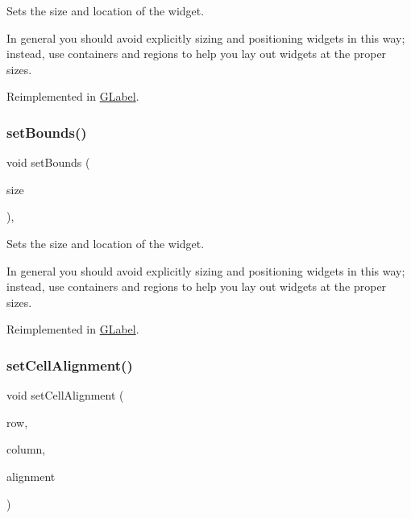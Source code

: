 Sets the size and location of the widget. 

In general you should avoid explicitly sizing and positioning widgets in this way; instead, use containers and regions to help you lay out widgets at the proper sizes. 

Reimplemented in \mbox{\hyperlink{classGLabel_aab3121dc97f8c5c1ddee39ea81d08509}{G\+Label}}.

\mbox{\label{classGInteractor_acada386653f008cacc7cce86426bef7c}} 
\subsubsection{\texorpdfstring{set\+Bounds()}{setBounds()}\hspace{0.1cm}{\footnotesize\ttfamily [2/2]}}
{\footnotesize\ttfamily void set\+Bounds (\begin{DoxyParamCaption}\item[{const \mbox{\hyperlink{classGRectangle}{G\+Rectangle}} \&}]{size }\end{DoxyParamCaption})\hspace{0.3cm}{\ttfamily [virtual]}, {\ttfamily [inherited]}}



Sets the size and location of the widget. 

In general you should avoid explicitly sizing and positioning widgets in this way; instead, use containers and regions to help you lay out widgets at the proper sizes. 

Reimplemented in \mbox{\hyperlink{classGLabel_a3ed96c7e7adaf111848a90978621066c}{G\+Label}}.

\mbox{\label{classGTable_a0c1ff398e920da7356b8375b66b9b083}} 
\subsubsection{\texorpdfstring{set\+Cell\+Alignment()}{setCellAlignment()}}
{\footnotesize\ttfamily void set\+Cell\+Alignment (\begin{DoxyParamCaption}\item[{int}]{row,  }\item[{int}]{column,  }\item[{Horizontal\+Alignment}]{alignment }\end{DoxyParamCaption})\hspace{0.3cm}{\ttfamily [virtual]}}



